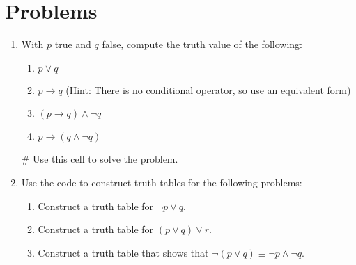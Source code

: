 \documentclass{ximera}
\begin{document}
\section{Problems}

    \begin{enumerate}
    \item With $p$ true and $q$ false, compute the truth value of the following:
    \begin{enumerate}
        \item $p\vee q$
        \item $p\to q$ (Hint: There is no conditional operator, so use an equivalent form)
        \item $(p\to q)\wedge \neg q$
        \item $p\to (q\wedge \neg q)$
    \end{enumerate}
\begin{sageCell}
# Use this cell to solve the problem.
\end{sageCell}

    \item Use the code  to construct truth tables for the following problems:
        \begin{enumerate}
            \item Construct a truth table for $\neg p \vee q$.
            \item Construct a truth table for $(p \vee q) \vee r$.
            \item Construct a truth table that shows that $\neg(p \vee q) \equiv \neg p \wedge \neg q$.
        \end{enumerate}
\end{enumerate}
\end{document}
